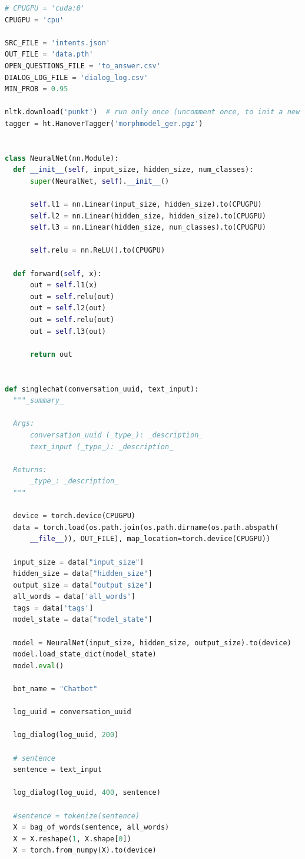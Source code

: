\documentclass[12pt,oneside,titlepage,listof=totoc,bibliography=totoc]{scrartcl}
\begin{document}
\begin{appendices}
\begin{lstlisting}[language=python]
# CPUGPU = 'cuda:0'
CPUGPU = 'cpu'

SRC_FILE = 'intents.json'
OUT_FILE = 'data.pth'
OPEN_QUESTIONS_FILE = 'to_answer.csv'
DIALOG_LOG_FILE = 'dialog_log.csv'
MIN_PROB = 0.95

nltk.download('punkt')  # run only once (uncomment once, to init a new system)
tagger = ht.HanoverTagger('morphmodel_ger.pgz')


class NeuralNet(nn.Module):
  def __init__(self, input_size, hidden_size, num_classes):
      super(NeuralNet, self).__init__()

      self.l1 = nn.Linear(input_size, hidden_size).to(CPUGPU)
      self.l2 = nn.Linear(hidden_size, hidden_size).to(CPUGPU)
      self.l3 = nn.Linear(hidden_size, num_classes).to(CPUGPU)

      self.relu = nn.ReLU().to(CPUGPU)

  def forward(self, x):
      out = self.l1(x)
      out = self.relu(out)
      out = self.l2(out)
      out = self.relu(out)
      out = self.l3(out)

      return out


def singlechat(conversation_uuid, text_input):
  """_summary_

  Args:
      conversation_uuid (_type_): _description_
      text_input (_type_): _description_

  Returns:
      _type_: _description_
  """

  device = torch.device(CPUGPU)
  data = torch.load(os.path.join(os.path.dirname(os.path.abspath(
      __file__)), OUT_FILE), map_location=torch.device(CPUGPU))

  input_size = data["input_size"]
  hidden_size = data["hidden_size"]
  output_size = data["output_size"]
  all_words = data['all_words']
  tags = data['tags']
  model_state = data["model_state"]

  model = NeuralNet(input_size, hidden_size, output_size).to(device)
  model.load_state_dict(model_state)
  model.eval()

  bot_name = "Chatbot"

  log_uuid = conversation_uuid

  log_dialog(log_uuid, 200)

  # sentence
  sentence = text_input

  log_dialog(log_uuid, 400, sentence)

  #sentence = tokenize(sentence)
  X = bag_of_words(sentence, all_words)
  X = X.reshape(1, X.shape[0])
  X = torch.from_numpy(X).to(device)


\end{lstlisting}
\end{appendices}
\end{document}
